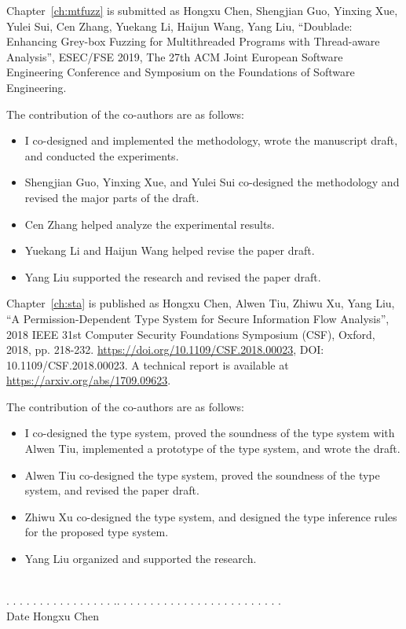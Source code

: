 \noindent Chapter~\ref{ch:mtfuzz} is submitted as Hongxu Chen, Shengjian Guo, Yinxing Xue, Yulei Sui, Cen Zhang, Yuekang Li, Haijun Wang, Yang Liu, ``Doublade: Enhancing Grey-box Fuzzing for Multithreaded Programs with Thread-aware Analysis'', ESEC/FSE 2019, The 27th ACM Joint European Software Engineering Conference and Symposium on the Foundations of Software Engineering.

\noindent The contribution of the co-authors are as follows:
\begin{itemize}
	\item I co-designed and implemented the methodology, wrote the manuscript draft, and conducted the experiments.
	\item Shengjian Guo, Yinxing Xue, and Yulei Sui co-designed the methodology and revised the major parts of the draft.
	\item Cen Zhang helped analyze the experimental results.
	\item Yuekang Li and Haijun Wang helped revise the paper draft.
	\item Yang Liu supported the research and revised the paper draft.
\end{itemize}

\noindent Chapter~\ref{ch:sta} is published as Hongxu Chen, Alwen Tiu, Zhiwu Xu, Yang Liu, ``A Permission-Dependent Type System for Secure Information Flow Analysis'', 2018 IEEE 31st Computer Security Foundations Symposium (CSF), Oxford, 2018, pp. 218-232. \url{https://doi.org/10.1109/CSF.2018.00023}, DOI: 10.1109/CSF.2018.00023. A technical report is available at \url{https://arxiv.org/abs/1709.09623}.

\noindent The contribution of the co-authors are as follows:
\begin{itemize}
	\item I co-designed the type system, proved the soundness of the type system with Alwen Tiu, implemented a prototype of the type system, and wrote the draft.
	\item Alwen Tiu co-designed the type system, proved the soundness of the type system, and revised the paper draft.
	\item Zhiwu Xu co-designed the type system, and designed the type inference rules for the proposed type system.
	\item Yang Liu organized and supported the research.
\end{itemize}

\vspace{150pt}

 \ \   \qquad \qquad \qquad \qquad\qquad\qquad\qquad\qquad\quad \\
. . . . . . . . . . . . . . . . .\qquad \qquad \qquad \qquad\qquad \qquad . . . .  . . . . . . . . . . . . . . . . . . . . .\\
\indent \qquad Date \qquad \qquad \qquad  \qquad \qquad \qquad\qquad\qquad\qquad\qquad Hongxu Chen
